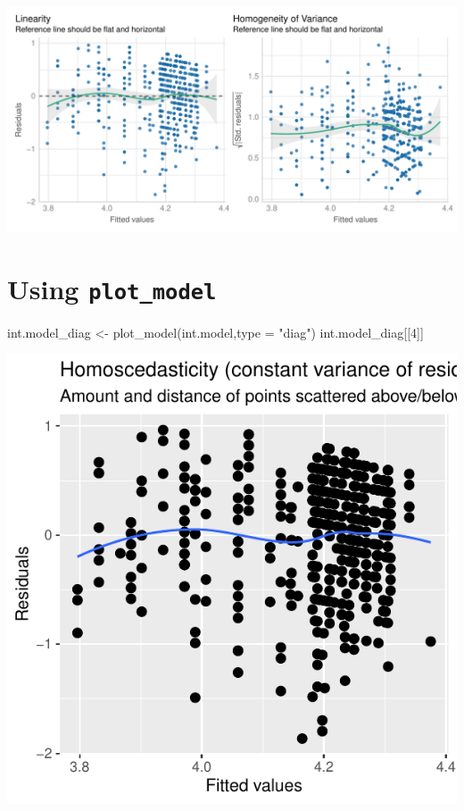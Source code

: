 \documentclass[
  letterpaper,
  DIV=11,
  numbers=noendperiod]{scrartcl}
\newenvironment{Shaded}{\begin{snugshade}}{\end{snugshade}}
\newcommand{\AttributeTok}[1]{\textcolor[rgb]{0.40,0.45,0.13}{#1}}
\newcommand{\DecValTok}[1]{\textcolor[rgb]{0.68,0.00,0.00}{#1}}
\newcommand{\FunctionTok}[1]{\textcolor[rgb]{0.28,0.35,0.67}{#1}}
\newcommand{\NormalTok}[1]{\textcolor[rgb]{0.00,0.23,0.31}{#1}}
\newcommand{\OtherTok}[1]{\textcolor[rgb]{0.00,0.23,0.31}{#1}}
\newcommand{\StringTok}[1]{\textcolor[rgb]{0.13,0.47,0.30}{#1}}
\begin{document}
\begin{center}
\includegraphics{notes_files/figure-pdf/unnamed-chunk-12-1.pdf}
\end{center}

\section{\texorpdfstring{Using \texttt{plot\_model}}{Using plot\_model}}

\begin{Shaded}
\begin{Highlighting}[]
\NormalTok{int.model\_diag }\OtherTok{\textless{}{-}} \FunctionTok{plot\_model}\NormalTok{(int.model,}\AttributeTok{type =} \StringTok{"diag"}\NormalTok{)}
\NormalTok{int.model\_diag[[}\DecValTok{4}\NormalTok{]]}
\end{Highlighting}
\end{Shaded}

\begin{center}
\includegraphics{notes_files/figure-pdf/unnamed-chunk-13-1.pdf}
\end{center}
\end{document}
